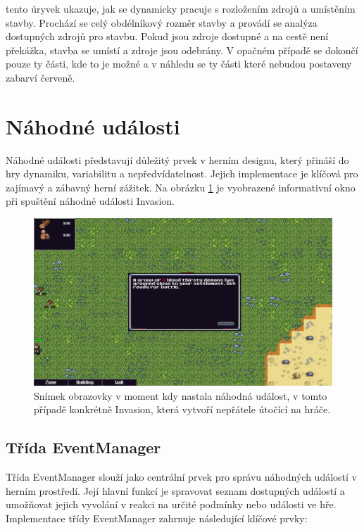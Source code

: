 tento úryvek ukazuje, jak se dynamicky pracuje s rozložením zdrojů a umístěním stavby. Prochází se celý obdélníkový rozměr stavby a provádí se analýza dostupných zdrojů pro stavbu. Pokud jsou zdroje dostupné a na cestě není překážka, stavba se umístí a zdroje jsou odebrány. V opačném případě se dokončí pouze ty části, kde to je možné a v náhledu se ty části které nebudou postaveny zabarví červeně.

\section{Náhodné události}
Náhodné události představují důležitý prvek v herním designu, který přináší do hry dynamiku, variabilitu a nepředvídatelnost. Jejich implementace je klíčová pro zajímavý a zábavný herní zážitek. Na obrázku \ref{RandomEvent} je vyobrazené informativní okno při spuštění náhodné události Invasion.

\begin{figure}[H]
	\centering
	\includegraphics[scale=0.55]{obrazky-figures/RandomEventPicture.png}
	\caption{Snímek obrazovky v moment kdy nastala náhodná událost, v tomto případě konkrétně Invasion, která vytvoří nepřátele útočící na hráče.}
	\label{RandomEvent}
\end{figure}

\subsection{Třída EventManager}
Třída EventManager slouží jako centrální prvek pro správu náhodných událostí v herním prostředí. Její hlavní funkcí je spravovat seznam dostupných událostí a umožňovat jejich vyvolání v reakci na určité podmínky nebo události ve hře. Implementace třídy EventManager zahrnuje následující klíčové prvky:

